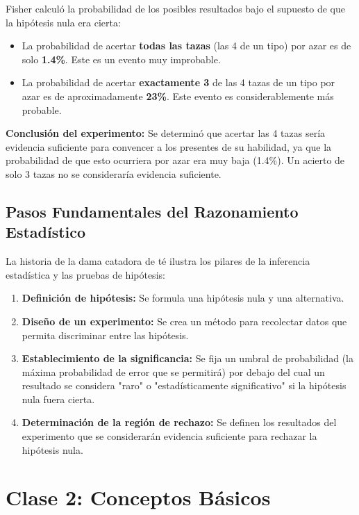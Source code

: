 \documentclass[11pt]{article}
\theoremstyle{definition} %
\begin{document}
Fisher calculó la probabilidad de los posibles resultados bajo el supuesto de que la hipótesis nula era cierta:
\begin{itemize}
    \item La probabilidad de acertar \textbf{todas las tazas} (las 4 de un tipo) por azar es de solo \textbf{1.4\%}. Este es un evento muy improbable.
    \item La probabilidad de acertar \textbf{exactamente 3} de las 4 tazas de un tipo por azar es de aproximadamente \textbf{23\%}. Este evento es considerablemente más probable.
\end{itemize}

\textbf{Conclusión del experimento:} Se determinó que acertar las 4 tazas sería evidencia suficiente para convencer a los presentes de su habilidad, ya que la probabilidad de que esto ocurriera por azar era muy baja (1.4\%). Un acierto de solo 3 tazas no se consideraría evidencia suficiente.

\subsection{Pasos Fundamentales del Razonamiento Estadístico}

La historia de la dama catadora de té ilustra los pilares de la inferencia estadística y las pruebas de hipótesis:
\begin{enumerate}
    \item \textbf{Definición de hipótesis:} Se formula una hipótesis nula y una alternativa.
    \item \textbf{Diseño de un experimento:} Se crea un método para recolectar datos que permita discriminar entre las hipótesis.
    \item \textbf{Establecimiento de la significancia:} Se fija un umbral de probabilidad (la máxima probabilidad de error que se permitirá) por debajo del cual un resultado se considera "raro" o "estadísticamente significativo" si la hipótesis nula fuera cierta.
    \item \textbf{Determinación de la región de rechazo:} Se definen los resultados del experimento que se considerarán evidencia suficiente para rechazar la hipótesis nula.
\end{enumerate}


\section{Clase 2: Conceptos Básicos}
\end{document}
